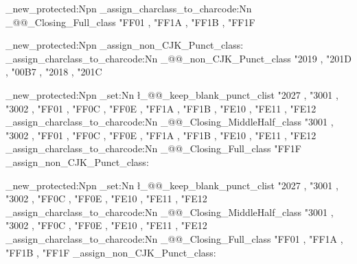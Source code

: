 \cs_new_protected:Npn \ChineseSimplifiedV
  {
    \ChineseSimplifiedH
    \@@_assign_charclass_to_charcode:Nn \g_@@_Closing_Full_class
      {
        "FF01 , "FF1A , "FF1B , "FF1F
      }
  }

\cs_new_protected:Npn \@@_assign_non_CJK_Punct_class:
  {
    \@@_assign_charclass_to_charcode:Nn \g_@@_non_CJK_Punct_class
      {
        "2019 , "201D ,
        "00B7 ,
        "2018 , "201C
      }
  }

\cs_new_protected:Npn \ChineseTraditionalH
  {
    \ChineseSimplifiedH
    \clist_set:Nn \l_@@_keep_blank_punct_clist
      {
        "2027 ,
        "3001 , "3002 , "FF01 , "FF0C , "FF0E ,
        "FF1A , "FF1B ,
        "FE10 , "FE11 , "FE12
      }
    \@@_assign_charclass_to_charcode:Nn \g_@@_Closing_MiddleHalf_class
      {
        "3001 , "3002 , "FF01 , "FF0C , "FF0E ,
        "FF1A , "FF1B ,
        "FE10 , "FE11 , "FE12
      }
    \@@_assign_charclass_to_charcode:Nn \g_@@_Closing_Full_class
      {
        "FF1F
      }
    \@@_assign_non_CJK_Punct_class:
  }

\cs_new_protected:Npn \ChineseTraditionalV
  {
    \ChineseSimplifiedH
    \clist_set:Nn \l_@@_keep_blank_punct_clist
      {
        "2027 ,
        "3001 , "3002 , "FF0C , "FF0E ,
        "FE10 , "FE11 , "FE12
      }
    \@@_assign_charclass_to_charcode:Nn \g_@@_Closing_MiddleHalf_class
      {
        "3001 , "3002 , "FF0C , "FF0E ,
        "FE10 , "FE11 , "FE12
      }
    \@@_assign_charclass_to_charcode:Nn \g_@@_Closing_Full_class
      {
        "FF01 , "FF1A , "FF1B , "FF1F
      }
    \@@_assign_non_CJK_Punct_class:
  }

\ExplSyntaxOff
\makeatother